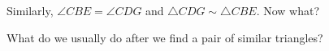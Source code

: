 










Similarly, $\angle CBE = \angle CDG$ and $\triangle CDG \sim \triangle CBE.$ Now what?

What do we usually do after we find a pair of similar triangles?










